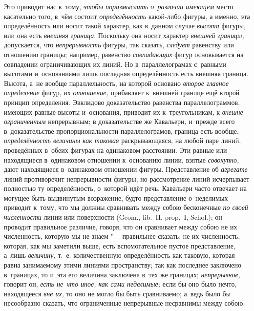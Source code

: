 Это приводит нас к~тому, {\em чтобы поразмыслить о~различии имеющем} место
касательно того, в~чём состоит {\em определённость} какой-либо фигуры, а
именно, эта определённость или носит такой характер, как в~данном случае
{\em высота} фигуры, или она есть {\em внешняя граница}. Поскольку она носит
характер {\em внешней границы,} допускается, что {\em непрерывность} фигуры,
так сказать, {\em следует} равенству или отношению границы; например, равенство
{\em совпадающих} фигур основывается на совпадении ограничивающих их линий. Но
в~параллелограмах с~равными высотами и~основаниями лишь последняя
определённость есть внешняя граница. Высота, а~не вообще параллельность, на
которой основано {\em второе главное определение} фигур, их {\em отношение,}
прибавляет к~внешней границе ещё второй принцип определения. Эвклидово
доказательство равенства параллелограммов, имеющих равные высоты и~основания,
приводит их к~треугольникам, к {\em внешне ограниченным} непрерывным; в
доказательстве же Кавальери, и~прежде всего в~доказательстве пропорциональности
параллелограмов, граница есть вообще, {\em определённость величины как таковая}
раскрывающаяся, на любой паре линий, проведённых в~обеих фигурах на одинаковом
расстоянии. Эти равные или находящиеся в~одинаковом отношении к~основанию
линии, взятые {\em совокупно,} дают находящиеся в~одинаковом отношении фигуры.
Представление об {\em агрегате} линий противоречит непрерывности фигуры; но
рассмотрение линий исчерпывает полностью ту определённость, о~которой идёт
речь. Кавальери часто отвечает на могущее быть выдвинутым возражение, будто
представление о~неделимых приводит к~тому, что мы должны сравнивать между собою
бесконечные {\em по своей численности} линии или поверхности (Geom., lib.~II,
prop.~I, Schol.); он проводит правильное различие, говоря, что он сравнивает
между собою не их численность, которую мы не знаем "--- правильнее сказать: не
их численность, которая, как мы заметили выше, есть вспомогательное пустое
представление, а~лишь {\em величину,} т.~е. количественную определённость как
таковую, которая равна занимаемому этими линиями пространству; так как
последнее заключено в~границах, то и~эта его величина заключена в~тех же
границах; {\em непрерывное,} говорит он, {\em есть не~что иное, как сами
неделимые;} если бы оно было нечто, находящееся {\em вне их,} то оно не могло
бы быть сравниваемо; а~ведь было бы несообразно сказать, что ограниченные
непрерывные несравнимы между собою.

